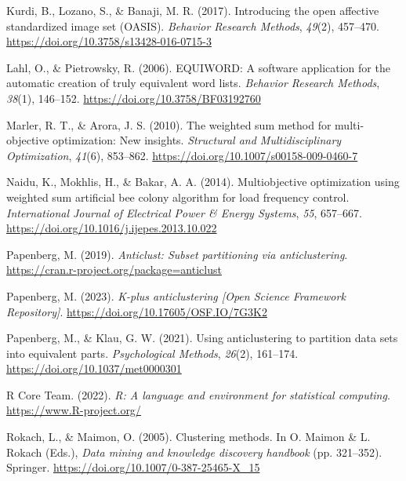 \documentclass[
  man,floatsintext]{apa7}
\newlength{\cslhangindent}
\newlength{\cslentryspacingunit} %
\newenvironment{CSLReferences}[2] %
 {%
  \setlength{\parindent}{0pt}
  \ifodd #1
  \let\oldpar\par
  \def\par{\hangindent=\cslhangindent\oldpar}
  \fi
  \setlength{\parskip}{#2\cslentryspacingunit}
 }%
 {}
\begin{document}
\begin{CSLReferences}{1}{0}
\leavevmode{}%
Kurdi, B., Lozano, S., \& Banaji, M. R. (2017). Introducing the open affective standardized image set (OASIS). \emph{Behavior Research Methods}, \emph{49}(2), 457--470. \url{https://doi.org/10.3758/s13428-016-0715-3}

\leavevmode{}%
Lahl, O., \& Pietrowsky, R. (2006). EQUIWORD: A software application for the automatic creation of truly equivalent word lists. \emph{Behavior Research Methods}, \emph{38}(1), 146--152. \url{https://doi.org/10.3758/BF03192760}

\leavevmode{}%
Marler, R. T., \& Arora, J. S. (2010). The weighted sum method for multi-objective optimization: New insights. \emph{Structural and Multidisciplinary Optimization}, \emph{41}(6), 853--862. \url{https://doi.org/10.1007/s00158-009-0460-7}

\leavevmode{}%
Naidu, K., Mokhlis, H., \& Bakar, A. A. (2014). Multiobjective optimization using weighted sum artificial bee colony algorithm for load frequency control. \emph{International Journal of Electrical Power \& Energy Systems}, \emph{55}, 657--667. \url{https://doi.org/10.1016/j.ijepes.2013.10.022}

\leavevmode{}%
Papenberg, M. (2019). \emph{Anticlust: Subset partitioning via anticlustering}. \url{https://cran.r-project.org/package=anticlust}

\leavevmode{}%
Papenberg, M. (2023). \emph{K-plus anticlustering {[}{Open Science Framework Repository}{]}}. \url{https://doi.org/10.17605/OSF.IO/7G3K2}

\leavevmode{}%
Papenberg, M., \& Klau, G. W. (2021). Using anticlustering to partition data sets into equivalent parts. \emph{Psychological Methods}, \emph{26}(2), 161--174. \url{https://doi.org/10.1037/met0000301}

\leavevmode{}%
R Core Team. (2022). \emph{R: A language and environment for statistical computing}. \url{https://www.R-project.org/}

\leavevmode{}%
Rokach, L., \& Maimon, O. (2005). Clustering methods. In O. Maimon \& L. Rokach (Eds.), \emph{Data mining and knowledge discovery handbook} (pp. 321--352). Springer. \url{https://doi.org/10.1007/0-387-25465-X_15}


\end{CSLReferences}
\end{document}
